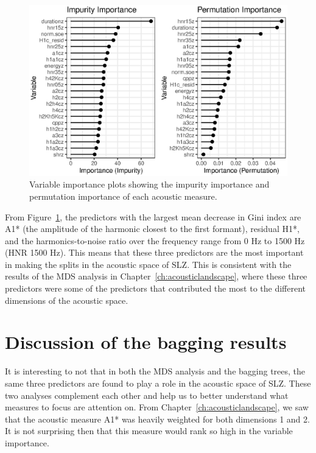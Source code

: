\begin{figure}[!ht]
    \centering
    \includegraphics[width = \linewidth]{images/RandomForest/rf_dur_plots.eps}
    \caption{Variable importance plots showing the impurity importance and permutation importance of each acoustic measure.}
    \label{fig:bagging_importance}
\end{figure}

From Figure~\ref{fig:bagging_importance}, the predictors with the largest mean decrease in Gini index are A1* (the amplitude of the harmonic closest to the first formant), residual H1*, and the harmonics-to-noise ratio over the frequency range from 0 Hz to 1500 Hz (HNR 1500 Hz). This means that these three predictors are the most important in making the splits in the acoustic space of SLZ. This is consistent with the results of the MDS analysis in Chapter~\ref{ch:acousticlandscape}, where these three predictors were some of the predictors that contributed the most to the different dimensions of the acoustic space. 

\section{Discussion of the bagging results} \label{sec:bagging_discussion}

It is interesting to not that in both the MDS analysis and the bagging trees, the same three predictors are found to play a role in the acoustic space of SLZ. These two analyses complement each other and help us to better understand what measures to focus are attention on. From Chapter~\ref{ch:acousticlandscape}, we saw that the acoustic measure A1* was heavily weighted for both dimensions 1 and 2. It is not surprising then that this measure would rank so high in the variable importance.

